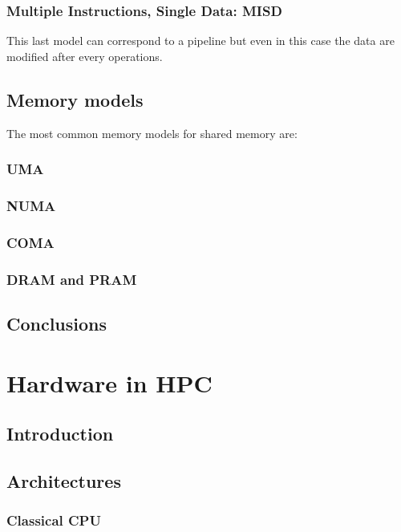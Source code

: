 \subsection{Multiple Instructions, Single Data: MISD}
This last model can correspond to a pipeline but even in this case the data are modified after every operations. 

\section{Memory models}
The most common memory models for shared memory are: 
\subsection{UMA}
\subsection{NUMA}
\subsection{COMA}

\subsection{DRAM and PRAM}

\section{Conclusions}

\chapter{Hardware in HPC}

\section{Introduction}

\section{Architectures}
\subsection{Classical CPU}

